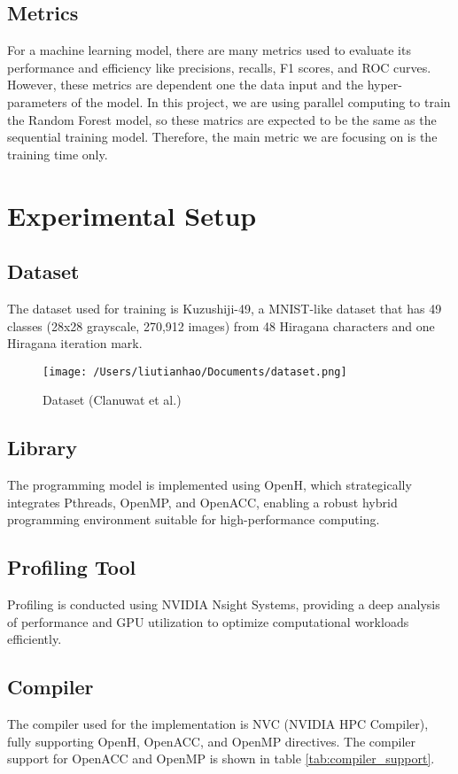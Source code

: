 \documentclass[13pt]{article}
\begin{document}
\subsection{Metrics}
For a machine learning model, there are many metrics used to evaluate its performance and efficiency like precisions, recalls, F1 scores, and ROC curves.
However, these metrics are dependent one the data input and the hyper-parameters of the model.
In this project, we are using parallel computing to train the Random Forest model, so these matrics are expected to be the same as the sequential training model.
Therefore, the main metric we are focusing on is the training time only.
\newpage
\section{Experimental Setup}

\subsection{Dataset}
The dataset used for training is Kuzushiji-49, a MNIST-like dataset that has 49 classes (28x28 grayscale, 270,912 images) from 48 Hiragana characters and one Hiragana iteration mark.

    \begin{figure}[ht]
        \centering
        \texttt{[image: /Users/liutianhao/Documents/dataset.png]}
        \caption{Dataset (Clanuwat et al.)\cite{paper4}}
        \label{fig:dataset}
    \end{figure}

\subsection{Library}
The programming model is implemented using OpenH, which strategically integrates Pthreads, OpenMP, and OpenACC, enabling a robust hybrid programming environment suitable for high-performance computing.

\subsection{Profiling Tool}
Profiling is conducted using NVIDIA Nsight Systems, providing a deep analysis of performance and GPU utilization to optimize computational workloads efficiently.

\subsection{Compiler}
The compiler used for the implementation is NVC (NVIDIA HPC Compiler), fully supporting OpenH, OpenACC, and OpenMP directives.  
The compiler support for OpenACC and OpenMP is shown in table \ref{tab:compiler_support}.
\end{document}
